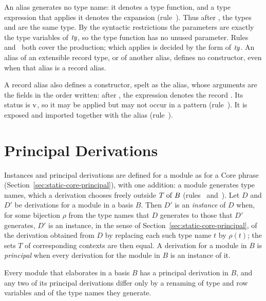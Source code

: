 \begin{rulecomments}
 An alias generates no type name: it denotes a type
function, and a type expression that applies it denotes the expansion
(rule~). Thus after , the types
 and  are the same type. By the syntactic restrictions the
parameters are exactly the type variables of $\mathit{ty}$, so the type function has no
unused parameter. Rules~
and~ both cover the production; which applies is
decided by the form of $\mathit{ty}$. An alias of an extensible record type, or of
another alias, defines no constructor, even when that alias is a record alias.

 A record alias also defines a constructor,
spelt as the alias, whose arguments are the fields in the order written: after
, the expression 
denotes the record . Its status is $\mathrm{v}$, so it
may be applied but may not occur in a pattern (rule~).
It is exposed and imported together with the alias
(rule~).
\end{rulecomments}

\section{Principal Derivations}\label{sec:static-modules-principal}

Instances and principal derivations are defined for a module as for a Core
phrase (Section~\ref{sec:static-core-principal}), with one addition: a module
generates type names, which a derivation chooses freely outside $T \mathrel{\mathrm{of}} B$
(rules~ and~). Let $D$ and
$D'$ be derivations for a module in a basis $B$. Then $D'$ is an
\emph{instance} of $D$ when, for some bijection $\rho$ from the type names that
$D$ generates to those that $D'$ generates, $D'$ is an instance, in the sense of
Section~\ref{sec:static-core-principal}, of the derivation obtained from $D$ by
replacing each such type name $t$ by $\rho(t)$; the sets $T$ of corresponding
contexts are then equal. A derivation for a module in $B$ is
\emph{principal} when every derivation for the module in $B$ is an instance of
it. %

\begin{property}
Every module that elaborates in a basis $B$ has a principal derivation in $B$,
and any two of its principal derivations differ only by a renaming of type and
row variables and of the type names they generate.
\end{property}


